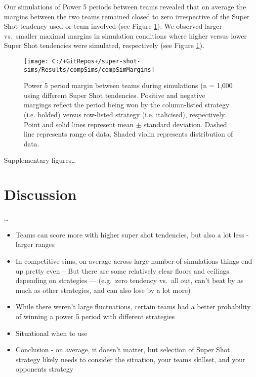 \documentclass[]{elsarticle} %
\providecommand{\tightlist}{%
  \setlength{\itemsep}{0pt}\setlength{\parskip}{0pt}}
\begin{document}
Our simulations of Power 5 periods between teams revealed that on
average the margins between the two teams remained closed to zero
irrespective of the Super Shot tendency used or team involved (see
Figure \ref{fig:compSimsMarginFigure}). We observed larger vs.~smaller
maximal margins in simulation conditions where higher versus lower Super
Shot tendencies were simulated, respectively (see Figure
\ref{fig:compSimsMarginFigure}).

\begin{landscape}

\begin{figure}

{\centering \texttt{[image: C:/+GitRepos+/super-shot-sims/Results/compSims/compSimMargins]} 

}

\caption{Power 5 period margin between teams during simulations (n = 1,000 using different Super Shot tendencies. Positive and negative margings reflect the period being won by the column-listed strategy (i.e. bolded) versus row-listed strategy (i.e. italicised), respectively. Point and solid lines represent mean $\pm$ standard deviation. Dashed line represents range of data. Shaded violin represents distribution of data.}\label{fig:compSimsMarginFigure}
\end{figure}

\end{landscape}

Supplementary figures\ldots{}

\hypertarget{discussion}{%
\section{Discussion}\label{discussion}}

\ldots{}

\begin{itemize}
\tightlist
\item
  Teams can score more with higher super shot tendencies, but also a lot
  less - larger ranges
\item
  In competitive sims, on average across large number of simulations
  things end up pretty even -- But there are some relatively clear
  floors and ceilings depending on strategies --- (e.g.~zero tendency
  vs.~all out, can't beat by as much as other strategies, and can also
  lose by a lot more)
\item
  While there weren't large fluctuations, certain teams had a better
  probability of winning a power 5 period with different strategies
\item
  Situational when to use
\item
  Conclusion - on average, it doesn't matter, but selection of Super
  Shot strategy likely needs to consider the situation, your teams
  skillset, and your opponents strategy
\end{itemize}
\end{document}
